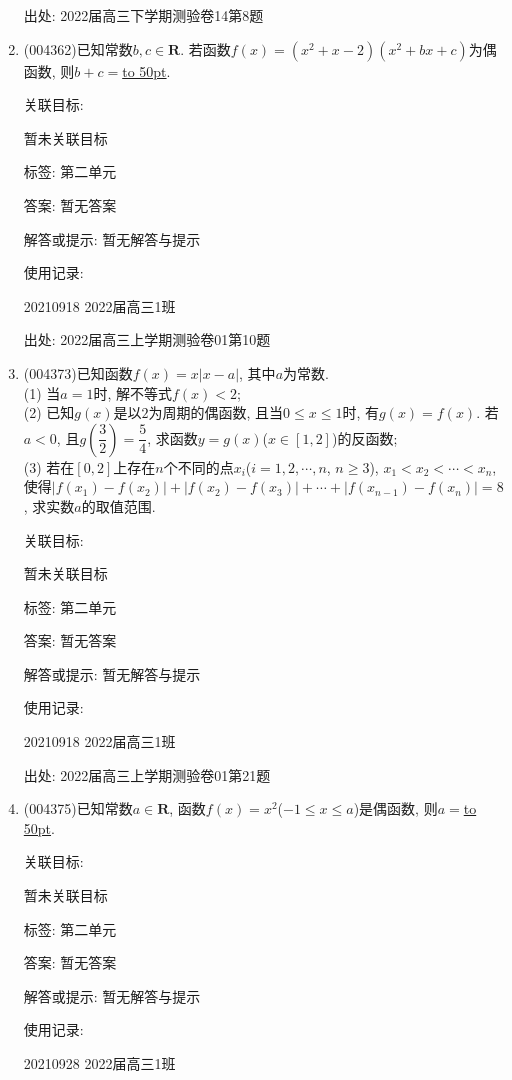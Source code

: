 \documentclass[10pt,a4paper]{article}
\newcommand{\blank}[1]{\underline{\hbox to #1pt{}}}
\begin{document}
\begin{enumerate}[1.]
出处: 2022届高三下学期测验卷14第8题
\item { (004362)}已知常数$b,c\in \mathbf{R}$. 若函数$f(x)=(x^2+x-2)(x^2+bx+c)$为偶函数, 则$b+c=$\blank{50}.


关联目标:

暂未关联目标



标签: 第二单元

答案: 暂无答案

解答或提示: 暂无解答与提示

使用记录:

20210918	2022届高三1班	


出处: 2022届高三上学期测验卷01第10题
\item { (004373)}已知函数$f(x)=x|x-a|$, 其中$a$为常数.\\
(1) 当$a=1$时, 解不等式$f(x)<2$;\\
(2) 已知$g(x)$是以$2$为周期的偶函数, 且当$0\le x\le 1$时, 有$g(x)=f(x)$. 若$a<0$, 且$g(\dfrac 32)=\dfrac 54$, 求函数$y=g(x)$($x\in [1,2]$)的反函数;\\
(3) 若在$[0,2]$上存在$n$个不同的点$x_i$($i=1,2,\cdots,n$, $n\ge 3$), $x_1<x_2<\cdots <x_n$, 使得$|f(x_1)-f(x_2)|+|f(x_2)-f(x_3)|+\cdots+|f(x_{n-1})-f(x_n)|=8$, 求实数$a$的取值范围.


关联目标:

暂未关联目标



标签: 第二单元

答案: 暂无答案

解答或提示: 暂无解答与提示

使用记录:

20210918	2022届高三1班			


出处: 2022届高三上学期测验卷01第21题
\item { (004375)}已知常数$a\in \mathbf{R}$, 函数$f(x)=x^2$($-1\le x\le a$)是偶函数, 则$a=$\blank{50}.


关联目标:

暂未关联目标



标签: 第二单元

答案: 暂无答案

解答或提示: 暂无解答与提示

使用记录:

20210928	2022届高三1班	



\end{enumerate}
\end{document}
